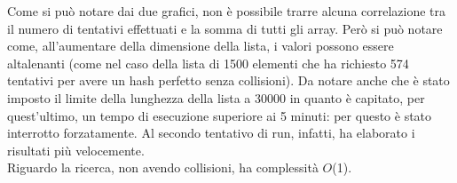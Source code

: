 \documentclass[]{article}
\begin{document}
Come si può notare dai due grafici, non è possibile trarre alcuna correlazione tra il numero di tentativi effettuati e la somma di tutti gli array. 
Però si può notare come, all'aumentare della dimensione della lista, i valori possono essere altalenanti 
(come nel caso della lista di 1500 elementi che ha richiesto 574 tentativi per avere un hash perfetto senza collisioni). 
Da notare anche che è stato imposto il limite della lunghezza della lista a 30000 in quanto è capitato, per quest'ultimo, un tempo di esecuzione superiore ai 5 minuti: 
per questo è stato interrotto forzatamente. Al secondo tentativo di run, infatti, ha elaborato i risultati più velocemente.\\
Riguardo la ricerca, non avendo collisioni, ha complessità $O$(1).
\end{document}
